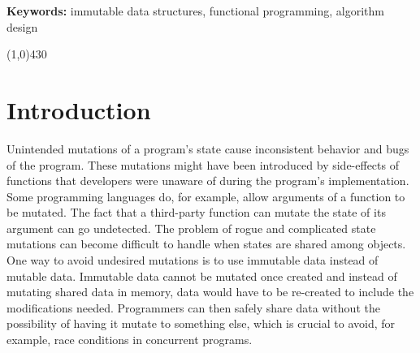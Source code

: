 \documentclass[12pt,twoside]{article}
\begin{document}
\vspace{5mm}

\noindent \textbf{Keywords:} immutable data structures, functional programming, algorithm design

\vspace{4mm}
\begin{center}
	\line(1,0){430}
\end{center}



\newpage
\tableofcontents
\newpage

\setcounter{page}{1}

\newpage
\section{Introduction}
Unintended mutations of a program’s state cause inconsistent behavior and bugs of the
program. These mutations might have been introduced by side-effects of functions that developers
were unaware of during the program’s implementation. Some programming languages do, for example,
allow arguments of a function to be mutated. The fact that a third-party function can mutate the
state of its argument can go undetected. The problem of rogue and complicated state mutations can
become difficult to handle when states are shared among objects. One way to avoid undesired mutations
is to use immutable data instead of mutable data. Immutable data cannot be mutated once created
and instead of mutating shared data in memory, data would have to be re-created to include the modifications
needed. Programmers can then safely share data without the possibility of having it mutate to
something else, which is crucial to avoid, for example, race conditions in concurrent programs.
\end{document}

